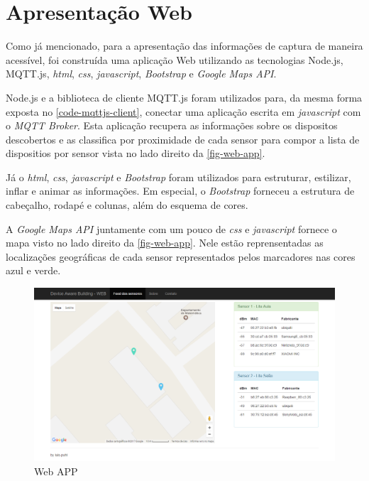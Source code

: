 \section{Apresentação Web}
\label{sec:app-web}

Como já mencionado, para a apresentação das informações de captura de maneira
acessível, foi construída uma aplicação Web utilizando as tecnologias
Node.js, MQTT.js, \emph{html}, \emph{css}, \emph{javascript},
\emph{Bootstrap} e \emph{Google Maps API}.

Node.js e a biblioteca de cliente MQTT.js foram utilizados para,
da mesma forma exposta no \autoref{code-mqttjs-client}, conectar
uma aplicação escrita em \emph{javascript} com o \emph{MQTT Broker}. Esta
aplicação recupera as informações sobre os dispositos descobertos e as
classifica por proximidade de cada sensor para compor a lista de dispositios
por sensor vista no lado direito da \autoref{fig-web-app}.

Já o \emph{html}, \emph{css}, \emph{javascript} e \emph{Bootstrap} foram
utilizados para estruturar, estilizar, inflar e animar as informações. Em
especial, o \emph{Bootstrap} forneceu a estrutura de cabeçalho, rodapé e colunas,
além do esquema de cores.

A \emph{Google Maps API} juntamente com um pouco de \emph{css} e
\emph{javascript} fornece o mapa visto no lado direito da \autoref{fig-web-app}.
Nele estão reprensentadas as localizações geográficas de cada sensor
representados pelos marcadores nas cores azul e verde.

\begin{figure}[htb]
	\caption{\label{fig-web-app}Web APP}
	\begin{center}
		\includegraphics[width=1\textwidth]{053-web/web-app.png}
	\end{center}
\end{figure}
